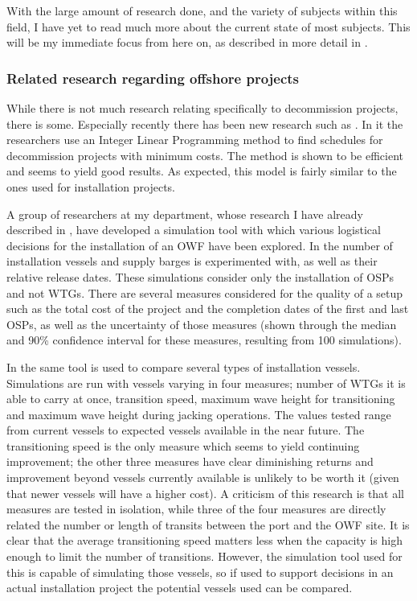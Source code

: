 \documentclass[a4paper,12pt]{article}
\begin{document}
With the large amount of research done, and the variety of subjects within this field, I have yet to read much more about the current state of most subjects. This will be my immediate focus from here on, as described in more detail in .

\subsubsection{Related research regarding offshore projects} \label{sss:offsh}
While there is not much research relating specifically to decommission projects, there is some. Especially recently there has been new research such as \cite{irawan2019optimisation}. In it the researchers use an Integer Linear Programming method to find schedules for decommission projects with minimum costs. The method is shown to be efficient and seems to yield good results. As expected, this model is fairly similar to the ones used for installation projects. 

\bigskip

A group of researchers at my department, whose research \cite{barlow2018mixed} I have already described in , have developed a simulation tool with which various logistical decisions for the installation of an OWF have been explored. In \cite{barlow2014support} the number of installation vessels and supply barges is experimented with, as well as their relative release dates. These simulations consider only the installation of OSPs and not WTGs. There are several measures considered for the quality of a setup such as the total cost of the project and the completion dates of the first and last OSPs, as well as the uncertainty of those measures (shown through the median and 90\% confidence interval for these measures, resulting from 100 simulations). 

In \cite{barlow2014assessment} the same tool is used to compare several types of installation vessels. Simulations are run with vessels varying in four measures; number of WTGs it is able to carry at once, transition speed, maximum wave height for transitioning and maximum wave height during jacking operations. The values tested range from current vessels to expected vessels available in the near future. The transitioning speed is the only measure which seems to yield continuing improvement; the other three measures have clear diminishing returns and improvement beyond vessels currently available is unlikely to be worth it (given that newer vessels will have a higher cost). A criticism of this research is that all measures are tested in isolation, while three of the four measures are directly related the number or length of transits between the port and the OWF site. It is clear that the average transitioning speed matters less when the capacity is high enough to limit the number of transitions. However, the simulation tool used for this is capable of simulating those vessels, so if used to support decisions in an actual installation project the potential vessels used can be compared. 
\end{document}
